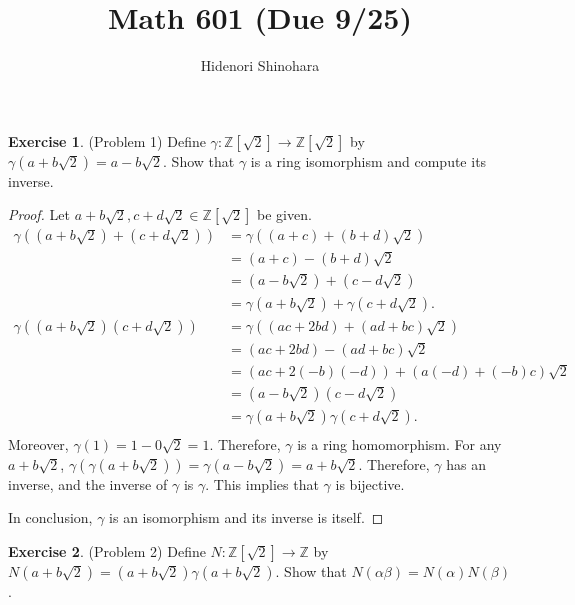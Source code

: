 \documentclass[12pt, psamsfonts]{amsart}
\theoremstyle{definition}
\newtheorem*{exer}{Exercise}
\theoremstyle{remark}
\numberwithin{equation}{section}
\begin{document}
\title{Math 601 (Due 9/25)}
\author{Hidenori Shinohara}
\maketitle

\begin{exer}{(Problem 1)}
  Define $\gamma: \mathbb{Z}[\sqrt{2}] \rightarrow \mathbb{Z}[\sqrt{2}]$ by $\gamma(a + b\sqrt{2}) = a - b\sqrt{2}$.
  Show that $\gamma$ is a ring isomorphism and compute its inverse.
\end{exer}

\begin{proof}
  Let $a + b\sqrt{2}, c + d\sqrt{2} \in \mathbb{Z}[\sqrt{2}]$ be given.
  \begin{align*}
    \gamma((a + b\sqrt{2}) + (c + d\sqrt{2}))
      &= \gamma((a + c) + (b + d)\sqrt{2}) \\
      &= (a + c) - (b + d)\sqrt{2} \\
      &= (a - b\sqrt{2}) + (c - d\sqrt{2}) \\
      &= \gamma(a + b\sqrt{2}) + \gamma(c + d\sqrt{2}). \\
    \gamma((a + b\sqrt{2})(c + d\sqrt{2}))
      &= \gamma((ac + 2bd) + (ad + bc)\sqrt{2}) \\
      &= (ac + 2bd) - (ad + bc)\sqrt{2} \\
      &= (ac + 2(-b)(-d)) + (a(-d) + (-b)c)\sqrt{2} \\
      &= (a - b\sqrt{2})(c - d\sqrt{2}) \\
      &= \gamma(a + b\sqrt{2})\gamma(c + d\sqrt{2}). \\
  \end{align*}
  Moreover, $\gamma(1) = 1 - 0\sqrt{2} = 1$.
  Therefore, $\gamma$ is a ring homomorphism.
  For any $a + b\sqrt{2}$, $\gamma(\gamma(a + b\sqrt{2})) = \gamma(a - b\sqrt{2}) = a + b\sqrt{2}$.
  Therefore, $\gamma$ has an inverse, and the inverse of $\gamma$ is $\gamma$.
  This implies that $\gamma$ is bijective.

  In conclusion, $\gamma$ is an isomorphism and its inverse is itself.
\end{proof}

\begin{exer}{(Problem 2)}
  Define $N: \mathbb{Z}[\sqrt{2}] \rightarrow \mathbb{Z}$ by $N(a + b\sqrt{2}) = (a + b\sqrt{2})\gamma(a + b\sqrt{2})$.
  Show that $N(\alpha\beta) = N(\alpha)N(\beta)$.
\end{exer}
\end{document}
